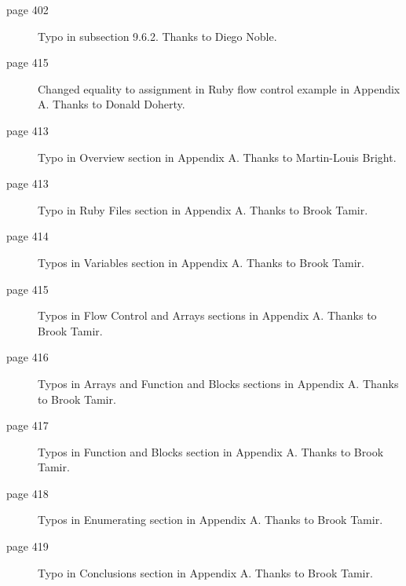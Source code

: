 \begin{small}
\begin{description}
	\item[page 402] Typo in subsection 9.6.2. Thanks to Diego Noble.
	\item[page 415] Changed equality to assignment in Ruby flow control example in Appendix A. Thanks to Donald Doherty.
	\item[page 413] Typo in Overview section in Appendix A. Thanks to Martin-Louis Bright.
	\item[page 413] Typo in Ruby Files section in Appendix A. Thanks to Brook Tamir.
	\item[page 414] Typos in Variables section in Appendix A. Thanks to Brook Tamir.
	\item[page 415] Typos in Flow Control and Arrays sections in Appendix A. Thanks to Brook Tamir.
	\item[page 416] Typos in Arrays and Function and Blocks sections in Appendix A. Thanks to Brook Tamir.
	\item[page 417] Typos in Function and Blocks section in Appendix A. Thanks to Brook Tamir.
	\item[page 418] Typos in Enumerating section in Appendix A. Thanks to Brook Tamir.
	\item[page 419] Typo in Conclusions section in Appendix A. Thanks to Brook Tamir.
\end{description}

\end{small}
